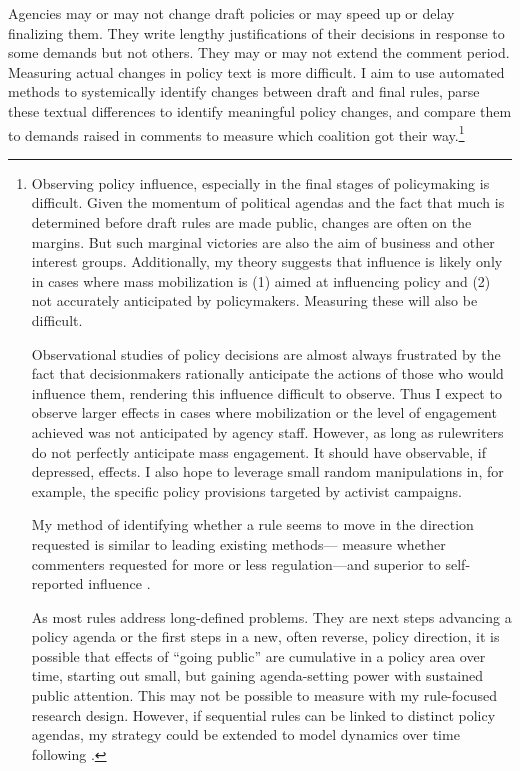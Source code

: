 Agencies may or may not change draft policies or may speed up or delay finalizing them. They write lengthy justifications of their decisions in response to some demands but not others. They may or may not extend the comment period. Measuring actual changes in policy text is more difficult. I aim to use automated methods to systemically identify changes between draft and final rules, parse these textual differences to identify meaningful policy changes, and compare them to demands raised in comments to measure which coalition got their way.\footnote{
Observing policy influence, especially in the final stages of policymaking is difficult. Given the momentum of political agendas and the fact that much is determined before draft rules are made public, changes are often on the margins. But such marginal victories are also the aim of business and other interest groups. 
Additionally, my theory suggests that influence is likely only in cases where mass mobilization is (1) aimed at influencing policy and (2) not accurately anticipated by policymakers. Measuring these will also be difficult.

Observational studies of policy decisions are almost always frustrated by the fact that decisionmakers rationally anticipate the actions of those who would influence them, rendering this influence difficult to observe. Thus I expect to observe larger effects in cases where mobilization or the level of engagement achieved was not anticipated by agency staff. However, 
as long as rulewriters do not perfectly anticipate mass engagement. It should have observable, if depressed, effects. I also hope to leverage small random manipulations in, for example, the specific policy provisions targeted by activist campaigns.

My method of identifying whether a rule seems to move in the direction requested is similar to leading existing methods---\citet{Yackee2006JOP} measure whether commenters requested for more or less regulation---and superior to self-reported influence \citep{Furlong1997}.

As most rules address long-defined problems. They are next steps advancing a policy agenda \citep{West2013} or the first steps in a new, often reverse, policy direction, it is possible that effects of ``going public'' are cumulative in a policy area over time, starting out small, but gaining agenda-setting power with sustained public attention. This may not be possible to measure with my rule-focused research design. However, if sequential rules can be linked to distinct policy agendas, my strategy could be extended to model dynamics over time following \citet{Brookhart2015}.
}  
